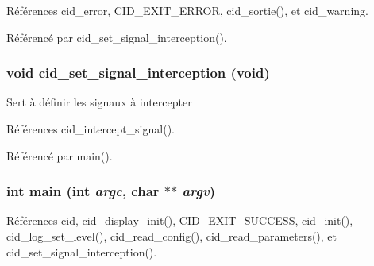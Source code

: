 Références cid\_\-error, CID\_\-EXIT\_\-ERROR, cid\_\-sortie(), et cid\_\-warning.

Référencé par cid\_\-set\_\-signal\_\-interception().
\subsubsection{\setlength{\rightskip}{0pt plus 5cm}void cid\_\-set\_\-signal\_\-interception (void)}\label{cid_8c_0efde490c4fbc1830577e136134601c9}


Sert à définir les signaux à intercepter 

Références cid\_\-intercept\_\-signal().

Référencé par main().
\subsubsection{\setlength{\rightskip}{0pt plus 5cm}int main (int {\em argc}, \/  char $\ast$$\ast$ {\em argv})}\label{cid_8c_3c04138a5bfe5d72780bb7e82a18e627}




Références cid, cid\_\-display\_\-init(), CID\_\-EXIT\_\-SUCCESS, cid\_\-init(), cid\_\-log\_\-set\_\-level(), cid\_\-read\_\-config(), cid\_\-read\_\-parameters(), et cid\_\-set\_\-signal\_\-interception().